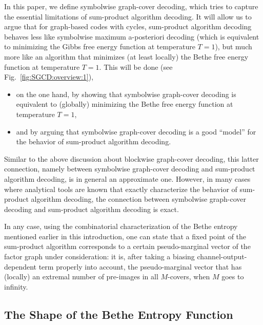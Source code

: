 \documentclass[journal, twocolumn]{IEEEtran}
\newcommand{\?}{\mathrm{?}}
\begin{document}
In this paper, we define symbolwise graph-cover decoding, which tries to
capture the essential limitations of sum-product algorithm decoding. It will
allow us to argue that for graph-based codes with cycles, sum-product
algorithm decoding behaves less like symbolwise maximum a-posteriori decoding
(which is equivalent to minimizing the Gibbs free energy function at
temperature $T = 1$), but much more like an algorithm that minimizes (at least
locally) the Bethe free energy function at temperature $T = 1$. This will be
done (see Fig.~\ref{fig:SGCD:overview:1}),
\begin{itemize}

\item on the one hand, by showing that symbolwise graph-cover decoding is
  equivalent to (globally) minimizing the Bethe free energy function at
  temperature $T = 1$,

\item and by arguing that symbolwise graph-cover decoding is a good ``model''
  for the behavior of sum-product algorithm decoding.

\end{itemize}
Similar to the above discussion about blockwise graph-cover decoding, this
latter connection, namely between symbolwise graph-cover decoding and
sum-product algorithm decoding, is in general an approximate one. However, in
many cases where analytical tools are known that exactly characterize the
behavior of sum-product algorithm decoding, the connection between symbolwise
graph-cover decoding and sum-product algorithm decoding is exact.

In any case, using the combinatorial characterization of the Bethe entropy
mentioned earlier in this introduction, one can state that a fixed point of
the sum-product algorithm corresponds to a certain pseudo-marginal vector of
the factor graph under consideration: it is, after taking a biasing
channel-output-dependent term properly into account, the pseudo-marginal
vector that has (locally) an extremal number of pre-images in all $M$-covers,
when $M$ goes to infinity.


\subsection{The Shape of the Bethe Entropy Function}
\end{document}
